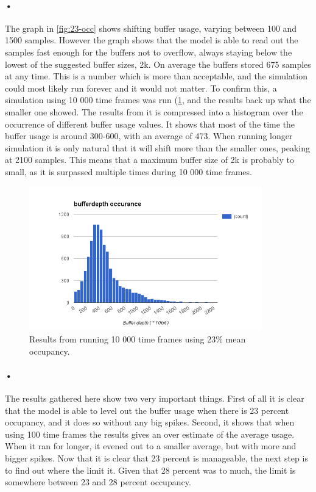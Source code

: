 \documentclass[a4paper, 12pt]{report}
\begin{document}
\paragraph{•}
The graph in \ref{fig:23-occ} shows shifting buffer usage, varying between 100 and 1500 samples.
However the graph shows that the model is able to read out the samples fast enough for the buffers not to overflow, always staying below the lowest of the suggested buffer sizes, 2k.
On average the buffers stored 675 samples at any time.
This is a number which is more than acceptable, and the simulation could most likely run forever and it would not matter.
To confirm this, a simulation using 10 000 time frames was run (\ref{fig:10k-23-occ}, and the results back up what the smaller one showed.
The results from it is compressed into a histogram over the occurrence of different buffer usage values.
It shows that most of the time the buffer usage is around 300-600, with an average of 473.
When running longer simulation it is only natural that it will shift more than the smaller ones, peaking at 2100 samples.
This means that a maximum buffer size of 2k is probably to small, as it is surpassed multiple times during 10 000 time frames.

\begin{figure}[h!]
	\centering
		\includegraphics[width=0.9\textwidth]{images/10k-23-occ.png}
		\caption{Results from running 10 000 time frames using 23\% mean occupancy.}
		\label{fig:10k-23-occ}
\end{figure}

\paragraph{•}
The results gathered here show two very important things.
First of all it is clear that the model is able to level out the buffer usage when there is 23 percent occupancy, and it does so without any big spikes.
Second, it shows that when using 100 time frames the results gives an over estimate of the average usage.
When it ran for longer, it evened out to a smaller average, but with more and bigger spikes.
Now that it is clear that 23 percent is manageable, the next step is to find out where the limit it.
Given that 28 percent was to much, the limit is somewhere between 23 and 28 percent occupancy.
\end{document}
